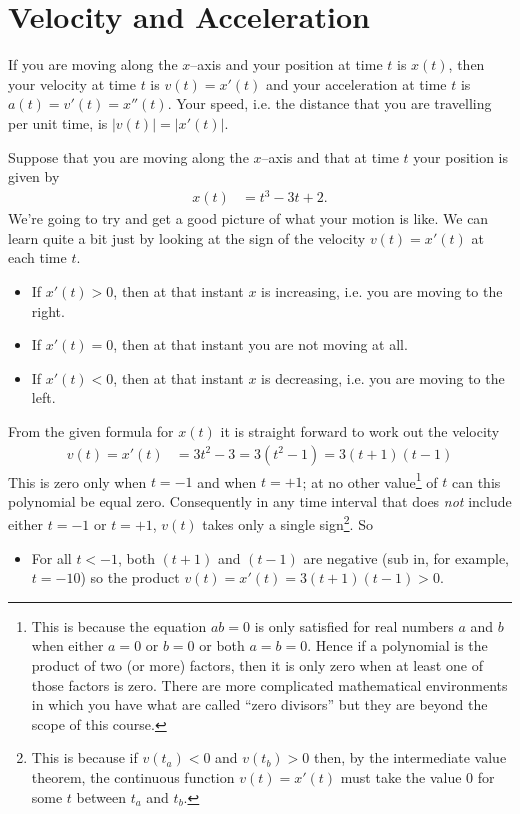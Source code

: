 \section{Velocity and Acceleration}\label{sec vel acc}

If you are moving along the $x$--axis and your position at time $t$
is $x(t)$, then your velocity at time $t$ is $v(t)=x'(t)$ and your
acceleration at time $t$ is $a(t)=v'(t) = x''(t)$. Your speed, i.e. the distance that you are travelling per unit time, is $|v(t)|=|x'(t)|$.

\begin{eg}\label{eg:velaccelA}
Suppose that you are moving along the $x$--axis and that
at time $t$ your position is given by
\begin{align*}
x(t)&=t^3-3t+2.
\end{align*}
We're going to try and get a good picture of what your motion is like. We can learn quite
a bit just by looking at the sign of the velocity $v(t)=x'(t)$ at each time $t$.
\begin{itemize}
\item If $x'(t)>0$, then at that instant $x$ is increasing, i.e. you are
moving to the right.

\item If $x'(t)=0$, then at that instant you are not
moving at all.
\item If $x'(t)<0$, then at that instant $x$ is decreasing, i.e. you are
moving to the left.
\end{itemize}
From the given formula for $x(t)$ it is straight forward to work out the velocity
\begin{align*}
v(t) = x'(t) &=3t^2-3=3(t^2-1)=3(t+1)(t-1)
\end{align*}
This is zero only when $t=-1$ and when $t=+1$; at no other value\footnote{This is because
the equation $ab=0$ is only satisfied for real numbers $a$ and $b$ when either $a=0$ or
$b=0$ or both $a=b=0$. Hence if a polynomial is the product of two (or more) factors,
then it is only zero when at least one of those factors is zero. There are more
complicated mathematical environments in which you have what are called ``zero divisors''
but they are beyond the scope of this course.} of $t$ can this polynomial be equal zero.
Consequently in any time interval that does \emph{not} include either $t=-1$ or $t=+1$,
$v(t)$ takes only a single sign\footnote{This is because if $v(t_a)<0$ and $v(t_b)>0$
then, by the intermediate value theorem, the continuous function $v(t)=x'(t)$ must take
the value $0$ for some $t$ between $t_a$ and $t_b$.}. So
\begin{itemize}
\item For all $t<-1$, both $(t+1)$ and $(t-1)$ are negative (sub in,
for example, $t=-10$) so the product $v(t)=x'(t)=3(t+1)(t-1)>0$.


\end{itemize}
\end{eg}
